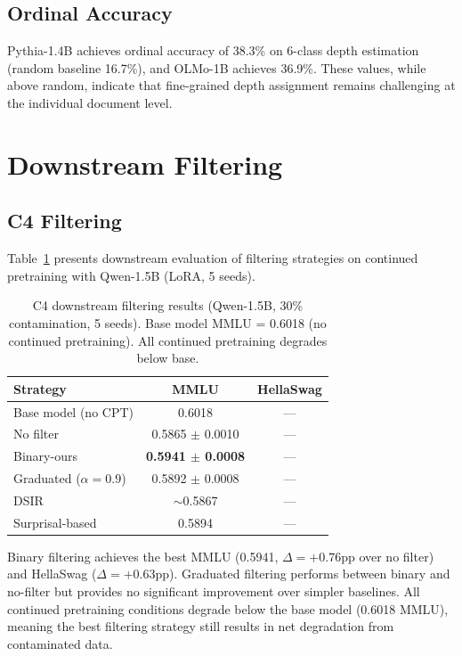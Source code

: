 \documentclass[11pt]{article}
\begin{document}
\subsection{Ordinal Accuracy}

Pythia-1.4B achieves ordinal accuracy of 38.3\% on 6-class depth estimation (random baseline 16.7\%), and OLMo-1B achieves 36.9\%. These values, while above random, indicate that fine-grained depth assignment remains challenging at the individual document level.


\section{Downstream Filtering}
\label{sec:filtering}

\subsection{C4 Filtering}

Table~\ref{tab:filtering_c4} presents downstream evaluation of filtering strategies on continued pretraining with Qwen-1.5B (LoRA, 5 seeds).

\begin{table}[t]
\centering
\caption{C4 downstream filtering results (Qwen-1.5B, 30\% contamination, 5 seeds). Base model MMLU = 0.6018 (no continued pretraining). All continued pretraining degrades below base.}
\label{tab:filtering_c4}
\small
\begin{tabular}{lcc}
\toprule
Strategy & MMLU & HellaSwag \\
\midrule
Base model (no CPT) & 0.6018 & --- \\
\midrule
No filter & 0.5865 $\pm$ 0.0010 & --- \\
Binary-ours & \textbf{0.5941 $\pm$ 0.0008} & --- \\
Graduated ($\alpha{=}0.9$) & 0.5892 $\pm$ 0.0008 & --- \\
DSIR & $\sim$0.5867 & --- \\
Surprisal-based & 0.5894 & --- \\
\bottomrule
\end{tabular}
\end{table}

Binary filtering achieves the best MMLU (0.5941, $\Delta = +0.76$pp over no filter) and HellaSwag ($\Delta = +0.63$pp). Graduated filtering performs between binary and no-filter but provides no significant improvement over simpler baselines. All continued pretraining conditions degrade below the base model (0.6018 MMLU), meaning the best filtering strategy still results in net degradation from contaminated data.
\end{document}
